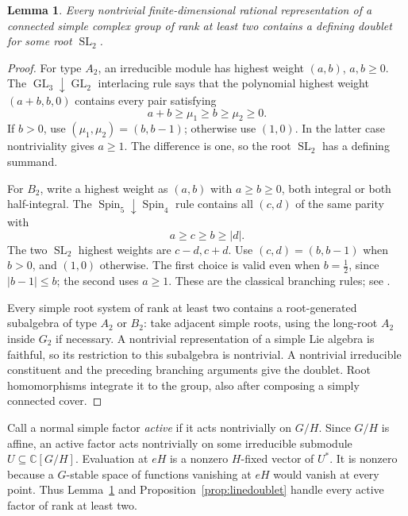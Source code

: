 \documentclass[11pt]{article}
\numberwithin{equation}{section}
\newtheorem{lemma}[theorem]{Lemma}
\theoremstyle{definition}
\theoremstyle{remark}
\newcommand{\C}{\mathbb C}
\newcommand{\SL}{\operatorname{SL}}
\newcommand{\GL}{\operatorname{GL}}
\begin{document}
\begin{lemma}\label{lem:doublet}
Every nontrivial finite-dimensional rational representation of a connected
simple complex group of rank at least two contains a defining doublet
for some root $\SL_2$.
\end{lemma}
\begin{proof}
For type $A_2$, an irreducible module has highest weight $(a,b)$,
$a,b\geq0$. The $\GL_3\downarrow\GL_2$ interlacing rule says that
the polynomial highest weight $(a+b,b,0)$ contains every pair satisfying
\[
 a+b\geq\mu_1\geq b\geq\mu_2\geq0.
\]
If $b>0$, use $(\mu_1,\mu_2)=(b,b-1)$; otherwise use $(1,0)$.
In the latter case nontriviality gives $a\geq1$. The difference is one,
so the root $\SL_2$ has a defining summand.

For $B_2$, write a highest weight as $(a,b)$ with $a\geq b\geq0$,
both integral or both half-integral. The
$\operatorname{Spin}_5\downarrow\operatorname{Spin}_4$ rule contains
all $(c,d)$ of the same parity with
\[
 a\geq c\geq b\geq|d|.
\]
The two $\SL_2$ highest weights are $c-d,c+d$.
Use $(c,d)=(b,b-1)$ when $b>0$, and $(1,0)$ otherwise.
The first choice is valid even when $b=\tfrac12$, since
$|b-1|\leq b$; the second uses $a\geq1$.
These are the classical branching rules; see
\cite[Theorem~2.1 and equation~(4.4)]{Molev}.

Every simple root system of rank at least two contains a root-generated
subalgebra of type $A_2$ or $B_2$: take adjacent simple roots, using
the long-root $A_2$ inside $G_2$ if necessary. A nontrivial representation
of a simple Lie algebra is faithful, so its restriction to this subalgebra
is nontrivial. A nontrivial irreducible constituent and the preceding
branching arguments give the doublet. Root homomorphisms integrate it
to the group, also after composing a simply connected cover.
\end{proof}

Call a normal simple factor \emph{active} if it acts nontrivially on
$G/H$. Since $G/H$ is affine, an active factor acts nontrivially on some
irreducible submodule
$U\subseteq\C[G/H]$. Evaluation at $eH$ is a nonzero $H$-fixed vector
of $U^*$. It is nonzero because a $G$-stable space of functions vanishing
at $eH$ would vanish at every point. Thus Lemma~\ref{lem:doublet} and
Proposition~\ref{prop:linedoublet} handle every active factor of rank
at least two.
\end{document}
